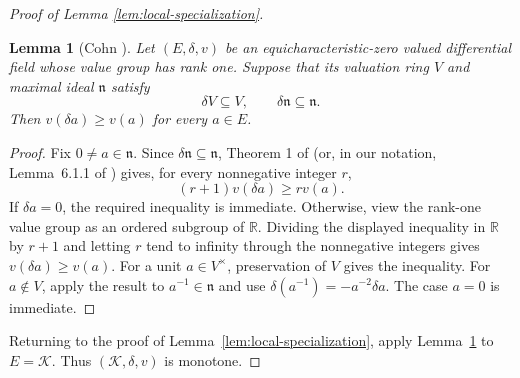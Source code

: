 \documentclass[12pt]{amsart}
\newtheorem{lemma}[theorem]{Lemma}
\theoremstyle{definition}
\numberwithin{subcase}{cases}
\theoremstyle{remark}
\DeclareMathOperator{\res}{res}
\DeclareMathOperator{\Frac}{Frac}
\begin{document}
\begin{proof}[Proof of Lemma \ref{lem:local-specialization}]
\begin{lemma}[Cohn \cite{Cohn77}]\label{lem:rank-one-monotonicity}
Let $(E,\delta,v)$ be an equicharacteristic-zero valued differential
field whose value group has rank one. Suppose that its valuation
ring $V$ and maximal ideal $\mathfrak n$ satisfy
\[
 \delta V\subseteq V,\qquad \delta\mathfrak n\subseteq\mathfrak n.
\]
Then $v(\delta a)\ge v(a)$ for every $a\in E$.
\end{lemma}

\begin{proof}
Fix $0\ne a\in\mathfrak n$. Since
$\delta\mathfrak n\subseteq\mathfrak n$, Theorem 1 of \cite{Cohn77} (or, in our notation, Lemma~6.1.1 of \cite{AschenbrennervandenDriesvanderHoeven17}) gives,
for every nonnegative integer $r$,
\[
 (r+1)v(\delta a)\ge r v(a).
\]
If $\delta a=0$, the required inequality is immediate.
Otherwise, view the rank-one value group as an ordered subgroup of
$\mathbb R$. Dividing the displayed inequality in $\mathbb R$ by
$r+1$ and letting $r$ tend to infinity through the nonnegative
integers gives $v(\delta a)\ge v(a)$.
For a unit $a\in V^\times$, preservation of $V$ gives the inequality.
For $a\notin V$, apply the result to $a^{-1}\in\mathfrak n$ and use
$\delta(a^{-1})=-a^{-2}\delta a$. The case $a=0$ is immediate.
\end{proof}

Returning to the proof of Lemma~\ref{lem:local-specialization},
apply Lemma~\ref{lem:rank-one-monotonicity} to $E=\mathcal K$.
Thus $(\mathcal K,\delta,v)$ is monotone.
\end{proof}



\end{document}
